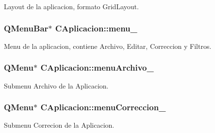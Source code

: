 Layout de la aplicacion, formato Grid\+Layout. 

\subsubsection[{\texorpdfstring{menu\+\_\+}{menu_}}]{\setlength{\rightskip}{0pt plus 5cm}Q\+Menu\+Bar$\ast$ C\+Aplicacion\+::menu\+\_\+\hspace{0.3cm}{\ttfamily [private]}}\hypertarget{classCAplicacion_af1ac43fa5f82c2512f211fc0dbb00a3a}{}\label{classCAplicacion_af1ac43fa5f82c2512f211fc0dbb00a3a}


Menu de la aplicacion, contiene Archivo, Editar, Correccion y Filtros. 

\subsubsection[{\texorpdfstring{menu\+Archivo\+\_\+}{menuArchivo_}}]{\setlength{\rightskip}{0pt plus 5cm}Q\+Menu$\ast$ C\+Aplicacion\+::menu\+Archivo\+\_\+\hspace{0.3cm}{\ttfamily [private]}}\hypertarget{classCAplicacion_abdf7a15d27725756e59d4408267d4688}{}\label{classCAplicacion_abdf7a15d27725756e59d4408267d4688}


Submenu Archivo de la Aplicacion. 

\subsubsection[{\texorpdfstring{menu\+Correccion\+\_\+}{menuCorreccion_}}]{\setlength{\rightskip}{0pt plus 5cm}Q\+Menu$\ast$ C\+Aplicacion\+::menu\+Correccion\+\_\+\hspace{0.3cm}{\ttfamily [private]}}\hypertarget{classCAplicacion_acb53cba72e72d1b6feb8203a4942b436}{}\label{classCAplicacion_acb53cba72e72d1b6feb8203a4942b436}


Submenu Correcion de la Aplicacion. 

